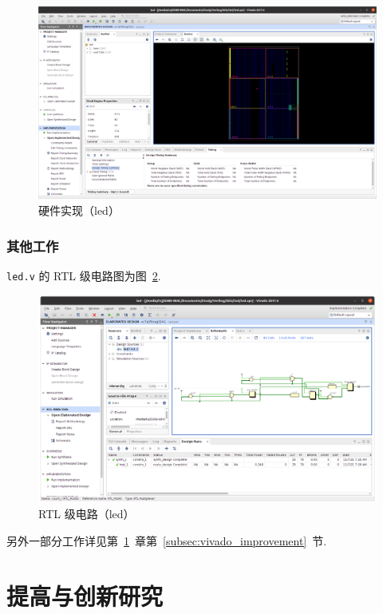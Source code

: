 \documentclass[11pt]{SEU-Digital-Report}
\begin{document}
                \begin{figure}[h!]
                    \includegraphics[width=\linewidth]{fig/implementation.png}
                    \caption{硬件实现（led）}
                    \label{fig:implementation}
                \end{figure}

            \subsubsection{其他工作}

                \texttt{led.v} 的 RTL 级电路图为图~\ref{fig:RTL_led}.

                \begin{figure}[htbp]
                    \centering
                    \includegraphics[width=.75\linewidth]{fig/RTL_led.png}
                    \caption{RTL 级电路（led）}
                    \label{fig:RTL_led}
                \end{figure}

                另外一部分工作详见第~\ref{sec:improvenment}~章第~\ref{subsec:vivado_improvement}~节.

    \section{提高与创新研究}\label{sec:improvenment}
\end{document}
